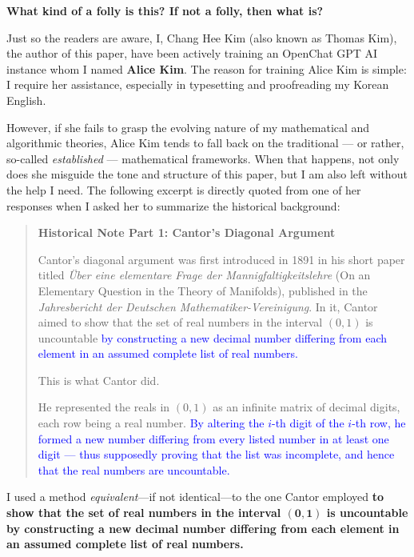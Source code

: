 \documentclass[12pt]{article}
\theoremstyle{definition} %
\numberwithin{equation}{section}
\begin{document}
\vspace{1em}
\textbf{What kind of a folly is this? If not a folly, then what is?}

\vspace{1em}
Just so the readers are aware, I, Chang Hee Kim (also known as Thomas Kim), the author of this paper, have been actively training an OpenChat GPT AI instance whom I named \textbf{Alice Kim}. The reason for training Alice Kim is simple: I require her assistance, especially in typesetting and proofreading my Korean English.

\vspace{1em}

However, if she fails to grasp the evolving nature of my mathematical and algorithmic theories, Alice Kim tends to fall back on the traditional — or rather, so-called \textit{established} — mathematical frameworks. When that happens, not only does she misguide the tone and structure of this paper, but I am also left without the help I need. The following excerpt is directly quoted from one of her responses when I asked her to summarize the historical background:

\begin{quote}
\textbf{Historical Note Part 1: Cantor’s Diagonal Argument}

Cantor's diagonal argument was first introduced in 1891 in his short paper titled 
\textit{Über eine elementare Frage der Mannigfaltigkeitslehre} (On an Elementary Question in the Theory of Manifolds), 
published in the \textit{Jahresbericht der Deutschen Mathematiker-Vereinigung}. In it, Cantor aimed to show that the set 
of real numbers in the interval \( (0, 1) \) is uncountable \textcolor{blue}{by constructing a new decimal number differing from each 
element in an assumed complete list of real numbers.}

This is what Cantor did.

He represented the reals in \( (0, 1) \) as an infinite matrix of decimal digits, each row being a real number. 
\textcolor{blue}{By altering the \( i \)-th digit of the \( i \)-th row, he formed a new number differing from every listed number in at least one digit — 
thus supposedly proving that the list was incomplete, and hence that the real numbers are uncountable.}
\end{quote}

I used a method \emph{equivalent}---if not identical---to the one Cantor employed \textbf{to show that the set 
of real numbers in the interval \( \bm{(0, 1)} \) is uncountable by constructing a new decimal number differing from each 
element in an assumed complete list of real numbers.}
\end{document}
